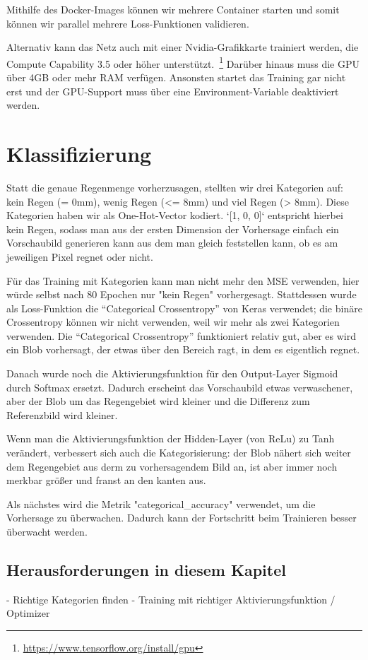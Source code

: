 \documentclass[11pt]{article}
\begin{document}
Mithilfe des Docker-Images können wir mehrere Container starten und somit können wir parallel mehrere Loss-Funktionen validieren.

Alternativ kann das Netz auch mit einer Nvidia-Grafikkarte trainiert werden, die Compute Capability 3.5 oder höher unterstützt.~\footnote{\url{https://www.tensorflow.org/install/gpu}} Darüber hinaus muss die GPU über 4GB oder mehr RAM verfügen. Ansonsten startet das Training gar nicht erst und der GPU-Support muss über eine Environment-Variable deaktiviert werden.


\section{Klassifizierung}
Statt die genaue Regenmenge vorherzusagen, stellten wir drei Kategorien auf: kein Regen (= 0mm), wenig Regen (<= 8mm) und viel Regen (> 8mm). Diese Kategorien haben wir als One-Hot-Vector kodiert. `[1, 0, 0]` entspricht hierbei kein Regen, sodass man aus der ersten Dimension der Vorhersage einfach ein Vorschaubild generieren kann aus dem man gleich feststellen kann, ob es am jeweiligen Pixel regnet oder nicht.

Für das Training mit Kategorien kann man nicht mehr den MSE verwenden, hier würde selbst nach 80 Epochen nur "kein Regen" vorhergesagt. Stattdessen wurde als Loss-Funktion die \enquote{Categorical Crossentropy} von Keras verwendet; die binäre Crossentropy können wir nicht verwenden, weil wir mehr als zwei Kategorien verwenden. Die \enquote{Categorical Crossentropy} funktioniert relativ gut, aber es wird ein Blob vorhersagt, der etwas über den Bereich ragt, in dem es eigentlich regnet.

Danach wurde noch die Aktivierungsfunktion für den Output-Layer Sigmoid durch Softmax ersetzt. Dadurch erscheint das Vorschaubild etwas verwaschener, aber der Blob um das Regengebiet wird kleiner und die Differenz zum Referenzbild wird kleiner.

Wenn man die Aktivierungsfunktion der Hidden-Layer (von ReLu) zu Tanh verändert, verbessert sich auch die Kategorisierung: der Blob nähert sich weiter dem Regengebiet aus derm zu vorhersagendem Bild an, ist aber immer noch merkbar größer und franst an den kanten aus.

Als nächstes wird die Metrik "categorical\_accuracy" verwendet, um die Vorhersage zu überwachen. Dadurch kann der Fortschritt beim Trainieren besser überwacht werden.


\subsection{Herausforderungen in diesem Kapitel}
- Richtige Kategorien finden
- Training mit richtiger Aktivierungsfunktion / Optimizer
\end{document}

